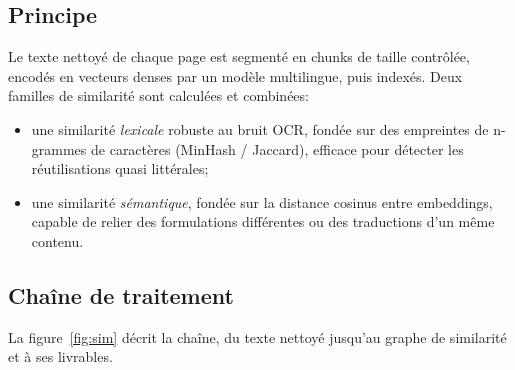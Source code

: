 \documentclass[11pt,a4paper]{article}
\begin{document}
\subsection{Principe}

Le texte nettoyé de chaque page est segmenté en chunks de taille contrôlée, encodés en vecteurs denses par un modèle multilingue, puis indexés. Deux familles de similarité sont calculées et combinées:

\begin{itemize}
  \item une similarité \emph{lexicale} robuste au bruit OCR, fondée sur des empreintes de n-grammes de caractères (MinHash / Jaccard), efficace pour détecter les réutilisations quasi littérales;
  \item une similarité \emph{sémantique}, fondée sur la distance cosinus entre embeddings, capable de relier des formulations différentes ou des traductions d'un même contenu.
\end{itemize}

\subsection{Chaîne de traitement}

La figure~\ref{fig:sim} décrit la chaîne, du texte nettoyé jusqu'au graphe de similarité et à ses livrables.
\end{document}
